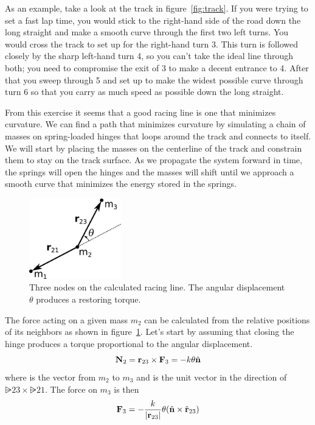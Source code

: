 \documentclass{article}
\begin{document}
As an example, take a look at the track in figure~\ref{fig:track}.  If you were
trying to set a fast lap time, you would stick to the right-hand side of the
road down the long straight and make a smooth curve through the first two left
turns.  You would cross the track to set up for the right-hand turn 3.  This
turn is followed closely by the sharp left-hand turn 4, so you can't take the
ideal line through both; you need to compromise the exit of 3 to make a decent
entrance to 4.  After that you sweep through 5 and set up to make the widest
possible curve through turn 6 so that you carry as much speed as possible
down the long straight.

From this exercise it seems that a good racing line is one that minimizes
curvature.  We can find a path that minimizes curvature by simulating a chain of
masses on spring-loaded hinges that loops around the track and connects to
itself.  We will start by placing the masses on the centerline of the track and
constrain them to stay on the track surface.  As we propagate the system forward
in time, the springs will open the hinges and the masses will shift until we
approach a smooth curve that minimizes the energy stored in the springs.

\begin{figure}
  \centering
  \includegraphics[width=4cm]{racing-line-nodes.png}
  \caption{Three nodes on the calculated racing line.  The angular displacement
    $\theta$ produces a restoring torque.}
  \label{fig:racing-line-nodes}
\end{figure}

The force acting on a given mass $m_2$ can be calculated from the relative
positions of its neighbors as shown in figure~\ref{fig:racing-line-nodes}.
Let's start by assuming that closing the hinge produces a torque proportional to
the angular displacement.
\begin{equation}
  \mathbf{N}_2 = \mathbf{r}_{\mathrm{23}} \times \mathbf{F}_3 = -k \theta \hat{\mathbf{n}}
\end{equation}
where  is the vector from $m_2$ to $m_3$ and  is the unit
vector in the direction of $\rsub{23} \times \rsub{21}$.  The force on $m_3$ is
then
\begin{equation}
  \mathbf{F}_3 = -\frac{k}{|\mathbf{r}_{\mathrm{23}}|} \theta (\hat{\mathbf{n}} \times \hat{\mathbf{r}}_{23})
  \label{eq:f-of-theta}
\end{equation}
\end{document}
